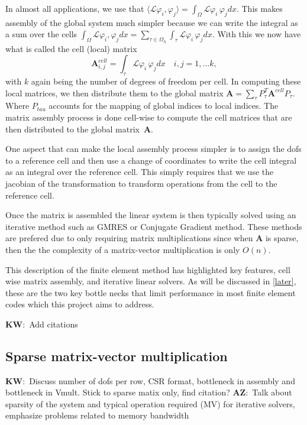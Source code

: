 \documentclass[12pt]{article}
\newcommand{\vect}[1]{\boldsymbol{\mathbf{#1}}}
\newcommand{\AZ}[1]{{\color{red}\textbf{AZ}:~#1}}
\newcommand{\KW}[1]{{\color{blue}\textbf{KW}:~#1}}
\begin{document}
In almost all applications, we use that 
$\langle \mathcal{L}\varphi_{i}, \varphi_{j}\rangle = \int_{\Omega}\mathcal{L}\varphi_{i}\, \varphi_{j}dx $. This makes assembly of the global system much simpler because we can write the integral as a sum over the cells $ \int_{\Omega}\mathcal{L}\varphi_{i}, \varphi_{j}dx = \sum_{\tau\in\Omega_h} \int_{\tau}\mathcal{L}\varphi_{i}\, \varphi_{j}dx $. With this we now have what is called the cell (local) matrix 
$$ 
	\mathbf{A}^{cell}_{i,j} = \int_{\tau}\mathcal{L}\varphi_{i}\, \varphi_{j}dx\quad i, j = 1, \ldots k,
$$ 
with $k$ again being the number of degrees of freedom per cell. In computing these local matrices, we then distribute them to the global matrix $ \mathbf{A} = \sum_{\tau}P^{T}_{\tau}\mathbf{A}^{cell}P_{\tau} $. Where $P_{tau}$ accounts for the mapping of global indices to local indices. The matrix assembly process is done cell-wise to compute the cell matrices that are then distributed to the global matrix~$\vect A$. 

One aspect that can make the local assembly process simpler is to assign the dofs to a reference cell and then use a change of coordinates to write the cell integral as an integral over the reference cell. This simply requires that we use the jacobian of the transformation to transform operations from the cell to the reference cell.

Once the matrix is assembled the linear system is then typically solved using an iterative method such as GMRES or Conjugate Gradient method. These methods are prefered due to only requiring matrix multiplications since when $\mathbf{A}$ is sparse, then the the complexity of a matrix-vector multiplication is only $O(n)$. 

This description of the finite element method has highlighted key features, cell wise matrix assembly, and iterative linear solvers. As will be discussed in \ref{later}, these are the two key bottle necks that limit performance in most finite element codes which this project aims to address. 

\KW{Add citations}

\subsection{Sparse matrix-vector multiplication}

\KW{Discuss number of dofs per row, CSR format, bottleneck in assembly and bottleneck in Vmult. Stick to sparse matix only, find citation?} 
\AZ{Talk about sparsity of the system and typical operation required (MV) for iterative solvers, emphasize problems related to memory bandwidth}
\end{document}

